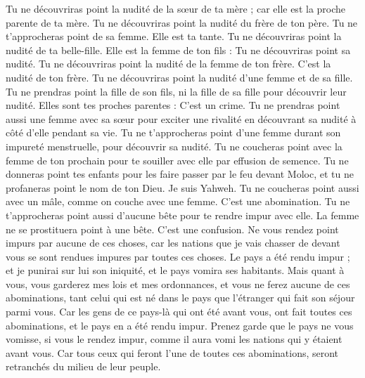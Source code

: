 \begin{multicols}{2}
Tu ne découvriras point la nudité de la sœur de ta mère ; car elle est la proche parente de ta mère.
Tu ne découvriras point la nudité du frère de ton père. Tu ne t'approcheras point de sa femme. Elle est ta tante.
Tu ne découvriras point la nudité de ta belle-fille. Elle est la femme de ton fils : Tu ne découvriras point sa nudité.
Tu ne découvriras point la nudité de la femme de ton frère. C'est la nudité de ton frère.
Tu ne découvriras point la nudité d'une femme et de sa fille. Tu ne prendras point la fille de son fils, ni la fille de sa fille pour découvrir leur nudité. Elles sont tes proches parentes : C'est un crime.
Tu ne prendras point aussi une femme avec sa sœur pour exciter une rivalité en découvrant sa nudité à côté d’elle pendant sa vie.
Tu ne t'approcheras point d’une femme durant son impureté menstruelle, pour découvrir sa nudité.
Tu ne coucheras point avec la femme de ton prochain pour te souiller avec elle par effusion de semence.
Tu ne donneras point tes enfants pour les faire passer par le feu devant Moloc, et tu ne profaneras point le nom de ton Dieu. Je suis Yahweh.
Tu ne coucheras point aussi avec un mâle, comme on couche avec une femme. C'est une abomination.
Tu ne t'approcheras point aussi d'aucune bête pour te rendre impur avec elle. La femme ne se prostituera point à une bête. C'est une confusion.
Ne vous rendez point impurs par aucune de ces choses, car les nations que je vais chasser de devant vous se sont rendues impures par toutes ces choses.
Le pays a été rendu impur ; et je punirai sur lui son iniquité, et le pays vomira ses habitants.
Mais quant à vous, vous garderez mes lois et mes ordonnances, et vous ne ferez aucune de ces abominations, tant celui qui est né dans le pays que l'étranger qui fait son séjour parmi vous.
Car les gens de ce pays-là qui ont été avant vous, ont fait toutes ces abominations, et le pays en a été rendu impur.
Prenez garde que le pays ne vous vomisse, si vous le rendez impur, comme il aura vomi les nations qui y étaient avant vous.
Car tous ceux qui feront l’une de toutes ces abominations, seront retranchés du milieu de leur peuple.

\end{multicols}

